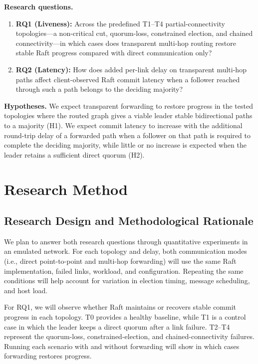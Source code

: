 \documentclass[11pt,a4paper]{article}
\begin{document}
\textbf{Research questions.}
\begin{enumerate}
  \item \textbf{RQ1 (Liveness):} Across the predefined T1--T4 partial-connectivity topologies---a non-critical cut, quorum-loss, constrained election, and chained connectivity---in which cases does transparent multi-hop routing restore stable Raft progress compared with direct communication only?
  \item \textbf{RQ2 (Latency):} How does added per-link delay on transparent multi-hop paths affect client-observed Raft commit latency when a follower reached through such a path belongs to the deciding majority?
\end{enumerate}

\textbf{Hypotheses.}
We expect transparent forwarding to restore progress in the tested topologies where the routed graph gives a viable leader stable bidirectional paths to a majority (H1). We expect commit latency to increase with the additional round-trip delay of a forwarded path when a follower on that path is required to complete the deciding majority, while little or no increase is expected when the leader retains a sufficient direct quorum (H2).

\section{Research Method}

\subsection{Research Design and Methodological Rationale}

We plan to answer both research questions through quantitative experiments in an emulated network. 
For each topology and delay, both communication modes (i.e., direct point-to-point and multi-hop forwarding) will use the same Raft implementation, failed links, workload, and configuration. 
Repeating the same conditions will help account for variation in election timing, message scheduling, and host load.

For RQ1, we will observe whether Raft maintains or recovers stable commit progress in each topology. 
T0 provides a healthy baseline, while T1 is a control case in which the leader keeps a direct quorum after a link failure. 
T2--T4 represent the quorum-loss, constrained-election, and chained-connectivity failures. 
Running each scenario with and without forwarding will show in which cases forwarding restores progress.
\end{document}
